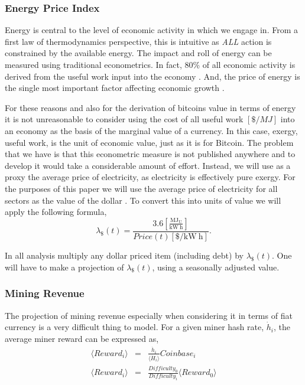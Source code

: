 \documentclass[runningheads]{llncs}
\begin{document}
\subsubsection{Energy Price Index}
Energy is central to the level of economic activity in which we engage in.
From a first law of thermodynamics perspective, this is intuitive as \emph{ALL} action is constrained by the available energy.
The impact and roll of energy can be measured using traditional econometrics.
In fact, 80\% of all economic activity is derived from the useful work input into the economy \cite{ayers2009engine}.
And, the price of energy is the single most important factor affecting economic growth \cite{ayers2009engine}.

For these reasons and also for the derivation of bitcoins value in terms of energy it is not unreasonable to consider using the cost of all useful work $[\$/MJ]$ into an economy as the basis of the marginal value of a currency.
In this case, exergy, useful work, is the unit of economic value, just as it is for Bitcoin.
The problem that we have is that this econometric measure is not published anywhere and to develop it would take a considerable amount of effort.
Instead, we will use as a proxy the average price of electricity, as electricity is effectively pure exergy.
For the purposes of this paper we will use the average price of electricity for all sectors as the value of the dollar \cite{eia2021browser}.
To convert this into units of value we will apply the following formula,
\begin{equation}
    \lambda_{\$}(t) = \frac{3.6[\frac{\mathrm{MJ_U}}{\mathrm{kW~h}}]}{Price(t)[\$/\mathrm{kW~h}]}.\label{eq:10}
\end{equation}

In all analysis multiply any dollar priced item (including debt) by $\lambda_{\$}(t)$.
One will have to make a projection of $\lambda_{\$}(t)$, using a seasonally adjusted value.

\subsubsection{Mining Revenue}
The projection of mining revenue especially when considering it in terms of fiat currency is a very difficult thing to model.
For a given miner hash rate, $\dot{h}_i$, the average miner reward can be expressed as,
\begin{eqnarray}
    \langle Reward_i \rangle & = & \frac{\dot{h}_i}{\langle \dot{H}_i \rangle} Coinbase_i \\
    \langle Reward_i \rangle & = & \frac{Difficulty_0}{Difficulty_i}\langle Reward_0 \rangle
\end{eqnarray}
\end{document}

